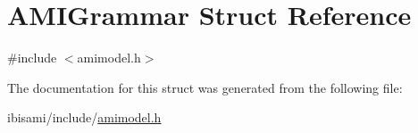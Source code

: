 \hypertarget{struct_a_m_i_grammar}{}\section{A\+M\+I\+Grammar Struct Reference}
\label{struct_a_m_i_grammar}


{\ttfamily \#include $<$amimodel.\+h$>$}



The documentation for this struct was generated from the following file\+:\begin{DoxyCompactItemize}
\item 
ibisami/include/\hyperlink{amimodel_8h}{amimodel.\+h}\end{DoxyCompactItemize}
